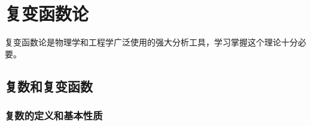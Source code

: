 
\chapter{复变函数论}
\label{chap:complexfunctions}
复变函数论是物理学和工程学广泛使用的强大分析工具，学习掌握这个理论十分必要。
\section{复数和复变函数}
\subsection{复数的定义和基本性质}

